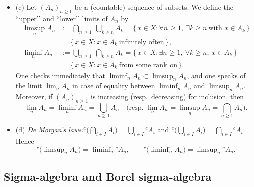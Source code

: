 \documentclass[12pt]{article}
\theoremstyle{definition}
\newtheorem{notation}{Notation}[section]
\begin{document}
\begin{itemize}
\begin{notation}
	If $\mathscr C\subset\mathcal P(Y)$ is a family of subsets of $Y$, we extend the notation by
\[
f^{-1}(\mathscr C):=\{\,f^{-1}(C): C\in\mathscr C\,\}\subset\mathcal P(X).
\]
\end{notation}

\medskip\noindent
\item (c) Let $(A_n)_{n\ge1}$ be a (countable) sequence of subsets. We define the “upper’’ and “lower’’ limits of $A_n$ by
\[
\begin{aligned}
\limsup_{n} A_n
&:= \bigcap_{n\ge1}\ \bigcup_{k\ge n} A_k
= \{\,x\in X: \forall n\ge1,\ \exists k\ge n\ \text{with } x\in A_k\,\}\\
&= \{\,x\in X: x\in A_k\ \text{infinitely often}\,\},\\[3pt]
\liminf_{n} A_n
&:= \bigcup_{n\ge1}\ \bigcap_{k\ge n} A_k
= \{\,x\in X: \exists n\ge1,\ \forall k\ge n,\ x\in A_k\,\}\\
&= \{\,x\in X: x\in A_k\ \text{from some rank on}\,\}.
\end{aligned}
\]
One checks immediately that $\liminf_{n} A_n\subset\limsup_{n} A_n$, and one speaks of the limit $\lim_{n} A_n$ in case of equality between $\liminf_{n} A_n$ and $\limsup_{n} A_n$.
Moreover, if $(A_n)_{n\ge1}$ is increasing (resp.\ decreasing) for inclusion, then
\[
\lim_{n} A_n=\liminf_{n} A_n=\bigcup_{n\ge1} A_n
\quad\text{(resp.\ } \lim_{n} A_n=\limsup_{n} A_n=\bigcap_{n\ge1} A_n\text{)}.
\]

\medskip\noindent
\item (d) \textit{De Morgan’s laws:}\quad ${}^{c}\!\bigl(\bigcap_{i\in I}A_i\bigr)=\bigcup_{i\in I}{}^{c}\!A_i$ and ${}^{c}\!\bigl(\bigcup_{i\in I}A_i\bigr)=\bigcap_{i\in I}{}^{c}\!A_i$.
Hence
\[
{}^{c}\!\bigl(\limsup\nolimits_{n}A_n\bigr)=\liminf\nolimits_{n}{}^{c}\!A_n,
\qquad
{}^{c}\!\bigl(\liminf\nolimits_{n}A_n\bigr)=\limsup\nolimits_{n}{}^{c}\!A_n.
\]
\end{itemize}
\subsection{Sigma-algebra and Borel sigma-algebra}\label{subsec:3.1}
\end{document}
